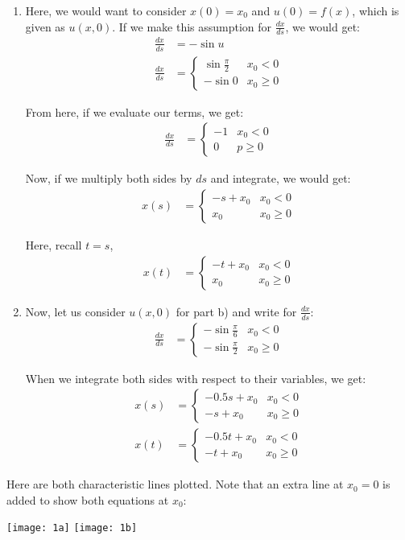 \begin{enumerate}
    \item
  Here, we would want to consider $x(0) = x_0$ and $u(0) = f(x)$, which is given as $u(x, 0)$. If we make this assumption for $\frac{dx}{ds}$, we would get:
  \begin{align}
    \frac{dx}{ds}
    & = - \sin u\\
    \frac{dx}{ds}
    & =
    \begin{cases}
      \sin \frac{\pi}{2} & x_0 < 0\\
      - \sin 0 & x_0 \geq 0
    \end{cases}
  \end{align}

  From here, if we evaluate our terms, we get:
  \begin{align}
    \frac{dx}{ds} & =
    \begin{cases}
      -1 & x_0 < 0\\
      0 & p \geq 0
    \end{cases}
  \end{align}

  Now, if we multiply both sides by $ds$ and integrate, we would get:
  \begin{align}
    x(s) & =
    \begin{cases}
      -s + x_0 & x_0 < 0\\
      x_0 & x_0 \geq 0
    \end{cases}
  \end{align}

  Here, recall $t = s$,
  \begin{align}
    x(t) & =
    \begin{cases}
      -t + x_0 & x_0 < 0\\
      x_0 & x_0 \geq 0
    \end{cases}
  \end{align}

  \item
  Now, let us consider $u(x, 0)$ for part b) and write for $\frac{dx}{ds}$:
  \begin{align}
    \frac{dx}{ds} & =
    \begin{cases}
      - \sin \frac{\pi}{6} & x_0 < 0\\
      - \sin \frac{\pi}{2} & x_0 \geq 0
    \end{cases}
  \end{align}

  When we integrate both sides with respect to their variables, we get:
  \begin{align}
    x(s) & =
    \begin{cases}
      - 0.5 s + x_0 & x_0 < 0\\
      - s + x_0 & x_0 \geq 0
    \end{cases}\\
    x(t) & =
    \begin{cases}
      - 0.5 t + x_0 & x_0 < 0\\
      -     t + x_0 & x_0 \geq 0
    \end{cases}
  \end{align}

\end{enumerate}

Here are both characteristic lines plotted. Note that an extra line at
$x_0 = 0$ is added to show both equations at $x_0$:
%
\begin{center}
  \texttt{[image: 1a]}
  \texttt{[image: 1b]}
\end{center}
